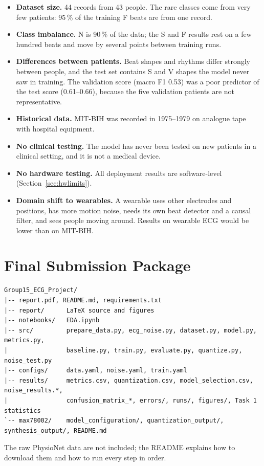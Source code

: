 \documentclass[11pt,a4paper]{article}
\begin{document}
\begin{itemize}
  \item \textbf{Dataset size.} 44 records from 43 people. The rare classes come from very few patients: 95\,\% of the training F beats are from one record.
  \item \textbf{Class imbalance.} N is 90\,\% of the data; the S and F results rest on a few hundred beats and move by several points between training runs.
  \item \textbf{Differences between patients.} Beat shapes and rhythms differ strongly between people, and the test set contains S and V shapes the model never saw in training. The validation score (macro F1 0.53) was a poor predictor of the test score (0.61--0.66), because the five validation patients are not representative.
  \item \textbf{Historical data.} MIT-BIH was recorded in 1975--1979 on analogue tape with hospital equipment.
  \item \textbf{No clinical testing.} The model has never been tested on new patients in a clinical setting, and it is not a medical device.
  \item \textbf{No hardware testing.} All deployment results are software-level (Section~\ref{sec:hwlimits}).
  \item \textbf{Domain shift to wearables.} A wearable uses other electrodes and positions, has more motion noise, needs its own beat detector and a causal filter, and sees people moving around. Results on wearable ECG would be lower than on MIT-BIH.
\end{itemize}

\section{Final Submission Package}

{\footnotesize
\begin{verbatim}
Group15_ECG_Project/
|-- report.pdf, README.md, requirements.txt
|-- report/      LaTeX source and figures
|-- notebooks/   EDA.ipynb
|-- src/         prepare_data.py, ecg_noise.py, dataset.py, model.py, metrics.py,
|                baseline.py, train.py, evaluate.py, quantize.py, noise_test.py
|-- configs/     data.yaml, noise.yaml, train.yaml
|-- results/     metrics.csv, quantization.csv, model_selection.csv, noise_results.*,
|                confusion_matrix_*, errors/, runs/, figures/, Task 1 statistics
`-- max78002/    model_configuration/, quantization_output/, synthesis_output/, README.md
\end{verbatim}
}

The raw PhysioNet data are not included; the README explains how to download them and how to run every step in order.



\end{document}
